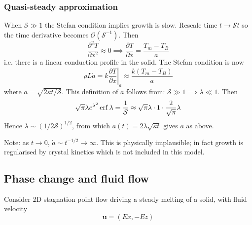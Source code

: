 \documentclass{jknotes}
\begin{document}
\subsubsection{Quasi-steady approximation}
When $\mathcal{S} \gg 1$ the Stefan condition implies growth is slow. Rescale
time $t \to \mathcal{S} t$ so the time derivative becomes
$\mathcal{O}(\mathcal{S}^{-1})$. Then
\begin{equation}
	\frac{\partial^2 T}{\partial x^2} \approx 0 \implies \frac{\partial
	T}{\partial x} = \frac{T_m - T_B}{a}
\end{equation}
i.e. there is a linear conduction profile in the solid. The Stefan condition
is now
\begin{equation}
	\rho L \dot{a} = k \left.\frac{\partial T}{\partial x} \right|_a \approx
	\frac{k(T_m - T_B)}{a}
\end{equation}
where $a = \sqrt{2\kappa t / \mathcal{S}}$. This definition of $a$ follows
from: $\mathcal{S} \gg 1 \implies \lambda \ll 1$. Then
\begin{equation}
	\sqrt{\pi} \lambda e^{\lambda^2} \erf \lambda = \frac{1}{\mathcal{S}}
	\approx \sqrt{\pi} \lambda \cdot 1 \cdot \frac{2}{\sqrt{\pi}} \lambda
\end{equation}
Hence $\lambda \sim (1/2\mathcal{S})^{1/2}$, from which $a(t) = 2\lambda
\sqrt{\kappa t}$ gives $a$ as above.

Note: as $t \to 0$, $\dot{a} \sim t^{-1/2} \to \infty$. This is physically
implausible; in fact growth is regularised by crystal kinetics which is not
included in this model.

\subsection{Phase change and fluid flow}
Consider 2D stagnation point flow driving a steady melting of a solid, with
fluid velocity
\begin{equation}
	\symbf{u} = (Ex, -Ez)
\end{equation}
\begin{center}
\end{center}
\end{document}
